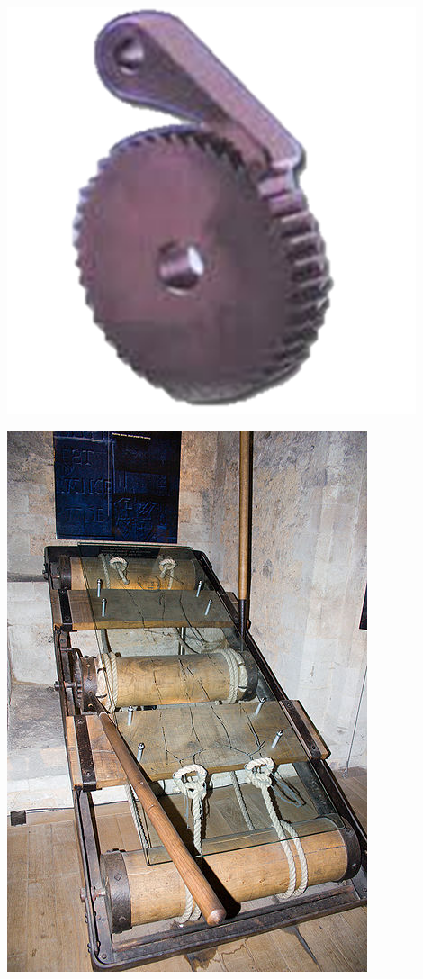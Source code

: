 \begin{frame}
\begin{minipage}{0.2\textwidth}
    \end{minipage}
\end{frame}

\begin{frame}
    \begin{minipage}{0.2\textwidth}
        \centering
        \includegraphics[width=0.9\textwidth]{img/catch.png} \\
    \end{minipage}
    \begin{minipage}{0.5\textwidth}
        \centering
        \includegraphics[height=0.9\textheight]{img/rack.png}

\end{minipage}
\end{frame}
